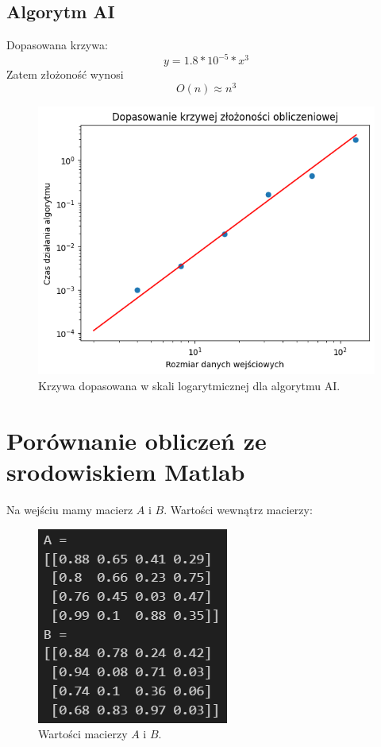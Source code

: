 \documentclass[11pt, leqno]{scrartcl}
\begin{document}
    \subsection{Algorytm AI}
    Dopasowana krzywa:
    \[
        y=1.8*10^{-5}*x^3
    \]
    Zatem złożoność wynosi
    \[
        O(n) \approx n^3
    \]
    \begin{figure}[H]
        \centering
        \includegraphics[width=0.8\linewidth]{zlozonosc_strassen.png}
        \caption{Krzywa dopasowana w skali logarytmicznej dla
            algorytmu AI.}
    \end{figure}

    \section{Porównanie obliczeń ze srodowiskiem Matlab}
    Na wejściu mamy macierz $A$ i $B$. Wartości wewnątrz macierzy:
    \begin{figure}[H]
        \centering
        \includegraphics[width=0.4\linewidth]{porownanie_wejscie.png}
        \caption{Wartości macierzy $A$ i $B$.}
    \end{figure}
\end{document}
